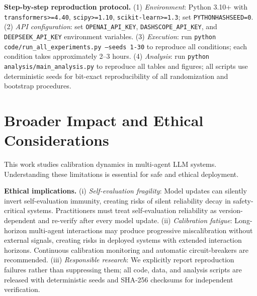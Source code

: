 \documentclass[11pt]{article}
\begin{document}
\textbf{Step-by-step reproduction protocol.} (1) \textit{Environment}: Python 3.10+ with \texttt{transformers>=4.40}, \texttt{scipy>=1.10}, \texttt{scikit-learn>=1.3}; set \texttt{PYTHONHASHSEED=0}. (2) \textit{API configuration}: set \texttt{OPENAI\_API\_KEY}, \texttt{DASHSCOPE\_API\_KEY}, and \texttt{DEEPSEEK\_API\_KEY} environment variables. (3) \textit{Execution}: run \texttt{python code/run\_all\_experiments.py --seeds 1-30} to reproduce all conditions; each condition takes approximately 2--3 hours. (4) \textit{Analysis}: run \texttt{python analysis/main\_analysis.py} to reproduce all tables and figures; all scripts use deterministic seeds for bit-exact reproducibility of all randomization and bootstrap procedures.

\section*{Broader Impact and Ethical Considerations}
\label{sec:ethics}

This work studies calibration dynamics in multi-agent LLM systems. Understanding these limitations is essential for safe and ethical deployment.

\textbf{Ethical implications.} (i) \textit{Self-evaluation fragility}: Model updates can silently invert self-evaluation immunity, creating risks of silent reliability decay in safety-critical systems. Practitioners must treat self-evaluation reliability as version-dependent and re-verify after every model update. (ii) \textit{Calibration fatigue}: Long-horizon multi-agent interactions may produce progressive miscalibration without external signals, creating risks in deployed systems with extended interaction horizons. Continuous calibration monitoring and automatic circuit-breakers are recommended. (iii) \textit{Responsible research}: We explicitly report reproduction failures rather than suppressing them; all code, data, and analysis scripts are released with deterministic seeds and SHA-256 checksums for independent verification.
\end{document}
